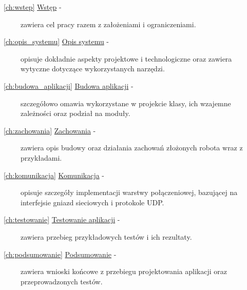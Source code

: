 \begin{description}
  \item[ {~\ref{ch:wstep} \hyperref[ch:wstep]{Wstęp} -} ]zawiera cel pracy razem z założeniami i ograniczeniami.
  \item[ {~\ref{ch:opis_systemu} \hyperref[ch:opis_systemu]{Opis systemu} -} ]opisuje dokładnie aspekty projektowe i technologiczne oraz zawiera wytyczne dotyczące wykorzystanych narzędzi.
  \item[ {~\ref{ch:budowa_aplikacji} \hyperref[ch:budowa_aplikacji]{Budowa aplikacji} -} ]szczegółowo omawia wykorzystane w projekcie klasy, ich wzajemne zależności oraz podział na moduły.
  \item[ {~\ref{ch:zachowania} \hyperref[ch:zachowania]{Zachowania} -} ]zawiera opis budowy oraz działania zachowań złożonych robota wraz z przykładami.
  \item[ {~\ref{ch:komunikacja} \hyperref[ch:komunikacja]{Komunikacja} -} ]opisuje szczegóły implementacji warstwy połączeniowej, bazującej na interfejsie gniazd sieciowych i protokole UDP.
  \item[ {~\ref{ch:testowanie} \hyperref[ch:testowanie]{Testowanie aplikacji} -} ]zawiera przebieg przykładowych testów i ich rezultaty.
  \item[ {~\ref{ch:podsumowanie} \hyperref[ch:podsumowanie]{Podsumowanie} -} ]zawiera wnioski końcowe z przebiegu projektowania aplikacji oraz przeprowadzonych testów.
\end{description}
